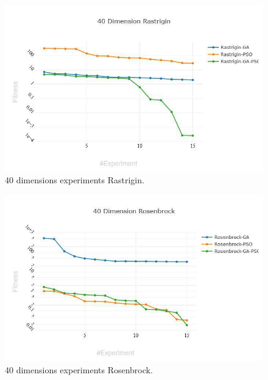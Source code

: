 \documentclass[runningheads]{llncs}
\begin{document}
        \begin{figure}[htp]
          \includegraphics[width=\textwidth]{img/40-rastrigin.jpg}
          \caption{40 dimensions experiments Rastrigin.} \label{fig1}
          \end{figure}

          \begin{figure}[htp]
            \includegraphics[width=\textwidth]{img/40-rosenbrock.jpg}
            \caption{40 dimensions experiments Rosenbrock.} \label{fig1}
            \end{figure}
\end{document}
